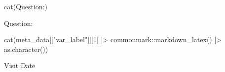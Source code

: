 \documentclass[
]{article}
\newenvironment{Shaded}{\begin{snugshade}}{\end{snugshade}}
\newcommand{\DecValTok}[1]{\textcolor[rgb]{0.00,0.00,0.81}{#1}}
\newcommand{\FunctionTok}[1]{\textcolor[rgb]{0.00,0.00,0.00}{#1}}
\newcommand{\NormalTok}[1]{#1}
\newcommand{\SpecialCharTok}[1]{\textcolor[rgb]{0.00,0.00,0.00}{#1}}
\newcommand{\StringTok}[1]{\textcolor[rgb]{0.31,0.60,0.02}{#1}}
\begin{document}
\begin{minipage}[t]{0.3\linewidth}

\begin{Shaded}
\begin{Highlighting}[]
\FunctionTok{cat}\NormalTok{(}\StringTok{\textquotesingle{}Question:\textquotesingle{}}\NormalTok{)}
\end{Highlighting}
\end{Shaded}

Question:

\end{minipage}%
\begin{minipage}[t]{0.7\linewidth}

\begin{Shaded}
\begin{Highlighting}[]
\FunctionTok{cat}\NormalTok{(meta\_data[[}\StringTok{"var\_label"}\NormalTok{]][}\DecValTok{1}\NormalTok{] }\SpecialCharTok{|\textgreater{}}\NormalTok{ commonmark}\SpecialCharTok{::}\FunctionTok{markdown\_latex}\NormalTok{() }\SpecialCharTok{|\textgreater{}} \FunctionTok{as.character}\NormalTok{())}
\end{Highlighting}
\end{Shaded}

Visit Date

\end{minipage}
\end{document}
